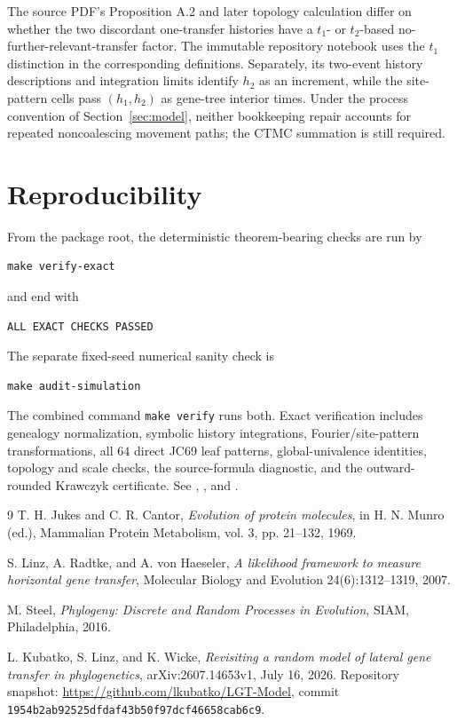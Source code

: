 \documentclass[11pt]{article}
\begin{document}
The source PDF's Proposition A.2 and later topology calculation differ on whether the two discordant one-transfer histories have a $t_1$- or $t_2$-based no-further-relevant-transfer factor.  The immutable repository notebook uses the $t_1$ distinction in the corresponding definitions.  Separately, its two-event history descriptions and integration limits identify $h_2$ as an increment, while the site-pattern cells pass $(h_1,h_2)$ as gene-tree interior times.  Under the process convention of Section~\ref{sec:model}, neither bookkeeping repair accounts for repeated noncoalescing movement paths; the CTMC summation is still required.

\section{Reproducibility}\label{app:repro}
From the package root, the deterministic theorem-bearing checks are run by
\begin{verbatim}
make verify-exact
\end{verbatim}
and end with
\begin{verbatim}
ALL EXACT CHECKS PASSED
\end{verbatim}
The separate fixed-seed numerical sanity check is
\begin{verbatim}
make audit-simulation
\end{verbatim}
The combined command \texttt{make verify} runs both.  Exact verification includes genealogy normalization, symbolic history integrations, Fourier/site-pattern transformations, all $64$ direct JC69 leaf patterns, global-univalence identities, topology and scale checks, the source-formula diagnostic, and the outward-rounded Krawczyk certificate.  See , , and .

\begin{thebibliography}{9}
T. H. Jukes and C. R. Cantor,
\emph{Evolution of protein molecules},
in H. N. Munro (ed.), Mammalian Protein Metabolism, vol. 3, pp. 21--132, 1969.

S. Linz, A. Radtke, and A. von Haeseler,
\emph{A likelihood framework to measure horizontal gene transfer},
Molecular Biology and Evolution 24(6):1312--1319, 2007.

M. Steel,
\emph{Phylogeny: Discrete and Random Processes in Evolution},
SIAM, Philadelphia, 2016.

L. Kubatko, S. Linz, and K. Wicke,
\emph{Revisiting a random model of lateral gene transfer in phylogenetics},
arXiv:2607.14653v1, July 16, 2026.
Repository snapshot: \url{https://github.com/lkubatko/LGT-Model}, commit
\texttt{1954b2ab92525dfdaf43b50f97dcf46658cab6c9}.
\end{thebibliography}
\end{document}
